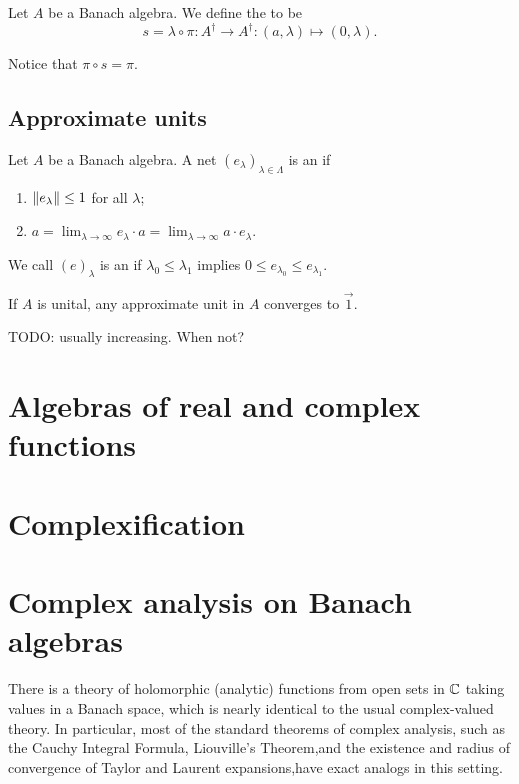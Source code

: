 \begin{definition}
Let $A$ be a Banach algebra. We define the  to be
\[ s = \lambda\circ \pi: A^\dagger \to A^\dagger: (a,\lambda) \mapsto (0,\lambda). \]
\end{definition}
Notice that $\pi\circ s = \pi$.

\subsection{Approximate units}
\begin{definition}
Let $A$ be a Banach algebra. A net $(e_\lambda)_{\lambda\in\Lambda}$ is an  if
\begin{enumerate}
\item $\lVert e_\lambda\rVert\leq 1$ for all $\lambda$;
\item $a = \lim_{\lambda\to \infty} e_\lambda \cdot a = \lim_{\lambda\to \infty} a \cdot e_\lambda$.
\end{enumerate}
We call $(e)_\lambda$ is an  if $\lambda_0 \leq \lambda_1$ implies $0\leq e_{\lambda_0} \leq e_{\lambda_1}$.
\end{definition}
\begin{lemma}
If $A$ is unital, any approximate unit in $A$ converges to $\vec{1}$.
\end{lemma}
TODO: usually increasing. When not?

\section{Algebras of real and complex functions}

\section{Complexification}

\section{Complex analysis on Banach algebras}
There is a theory of holomorphic (analytic) functions from open sets in $\mathbb{C}$ taking values in a Banach space, which is nearly identical to the usual complex-valued theory. In particular, most of the standard theorems of complex analysis, such as the Cauchy Integral Formula, Liouville’s Theorem,and the existence and radius of convergence of Taylor and Laurent expansions,have exact analogs in this setting. 

